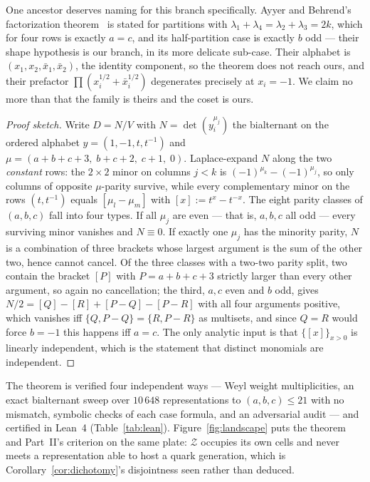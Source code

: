 \documentclass[11pt,a4paper]{article}
\begin{document}
One ancestor deserves naming for this branch specifically. Ayyer and
Behrend's factorization theorem~\cite[Thm.~1]{AyyerBehrend} is stated for partitions with
$\lambda_1+\lambda_4=\lambda_2+\lambda_3=2k$, which for four rows is exactly $a=c$, and its
half-partition case is exactly $b$ odd --- their shape hypothesis is our branch, in its more
delicate sub-case. Their alphabet is $(x_1,x_2,\bar x_1,\bar x_2)$, the identity component, so
the theorem does not reach ours, and their prefactor $\prod(x_i^{1/2}+\bar x_i^{1/2})$
degenerates precisely at $x_i=-1$. We claim no more than that the family is theirs and the
coset is ours.

\begin{proof}[Proof sketch]
Write $D=N/V$ with $N=\det(y_i^{\mu_j})$ the bialternant on the ordered alphabet
$y=(1,-1,t,t^{-1})$ and $\mu=(a{+}b{+}c{+}3,\;b{+}c{+}2,\;c{+}1,\;0)$. Laplace-expand $N$
along the two \emph{constant} rows: the $2\times2$ minor on columns $j<k$ is
$(-1)^{\mu_k}-(-1)^{\mu_j}$, so only columns of opposite $\mu$-parity survive, while every
complementary minor on the rows $(t,t^{-1})$ equals $[\mu_l-\mu_m]$ with
$[x]:=t^x-t^{-x}$. The eight parity classes of $(a,b,c)$ fall into four types. If all $\mu_j$
are even --- that is, $a,b,c$ all odd --- every surviving minor vanishes and $N\equiv0$. If
exactly one $\mu_j$ has the minority parity, $N$ is a combination of three brackets whose
largest argument is the sum of the other two, hence cannot cancel. Of the three classes with
a two-two parity split, two contain the bracket $[P]$ with $P=a{+}b{+}c{+}3$ strictly larger
than every other argument, so again no cancellation; the third, $a,c$ even and $b$ odd, gives
$N/2=[Q]-[R]+[P{-}Q]-[P{-}R]$ with all four arguments positive, which vanishes iff
$\{Q,P{-}Q\}=\{R,P{-}R\}$ as multisets, and since $Q=R$ would force $b=-1$ this happens iff
$a=c$. The only analytic input is that $\{[x]\}_{x>0}$ is linearly independent, which is the
statement that distinct monomials are independent.
\end{proof}

The theorem is verified four independent ways --- Weyl weight multiplicities, an exact
bialternant sweep over $10\,648$ representations to $(a,b,c)\le21$ with no mismatch, symbolic
checks of each case formula, and an adversarial audit --- and certified in Lean~4
(Table~\ref{tab:lean}). Figure~\ref{fig:landscape} puts the theorem and Part~II's criterion on
the same plate: $\mathcal Z$ occupies its own cells and never meets a representation able to
host a quark generation, which is Corollary~\ref{cor:dichotomy}'s disjointness seen rather
than deduced.
\end{document}
